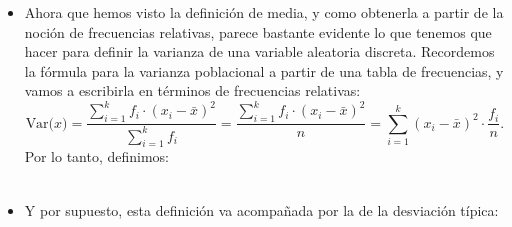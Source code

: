 \begin{itemize}

        \item Ahora que hemos visto la definición de media, y como obtenerla a partir de la noción de frecuencias relativas, parece bastante evidente lo que tenemos que hacer para definir la varianza de una variable aleatoria discreta. Recordemos la fórmula para la varianza poblacional a partir de una tabla de frecuencias, y vamos a escribirla en términos de frecuencias relativas:
            \[
            \mbox{Var($x$)}=\dfrac{\displaystyle\sum_{i=1}^k{ f_i\cdot}(x_i-\bar x)^2}{{ \displaystyle\sum_{i=1}^k f_i}}=
            \dfrac{\displaystyle\sum_{i=1}^k{ f_i\cdot}(x_i-\bar x)^2}{n}=
            \displaystyle\sum_{i=1}^k{(x_i-\bar x)^2\cdot}\dfrac{f_i}{n}.
           \]
           Por lo tanto, definimos:\\[3mm]
           \\[3mm]

           \item Y por supuesto, esta definición va acompañada por la de la desviación típica:\\[3mm]
           \\[3mm]



\end{itemize}


